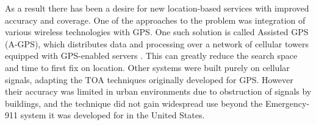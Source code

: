 
As a result there has been a desire for new location-based services with improved accuracy and coverage. One of the approaches to the problem was integration of various wireless technologies with GPS. One such solution is called Assisted GPS (A-GPS), which distributes data and processing over a network of cellular towers equipped with GPS-enabled servers \cite{AGPS}. This can greatly reduce the search space and time to first fix on location. Other systems were built purely on cellular signals, adapting the TOA techniques originally developed for GPS. However their accuracy was limited in urban environments due to obstruction of signals by buildings, and the technique did not gain widespread use beyond the Emergency-911 system it was developed for in the United States.

